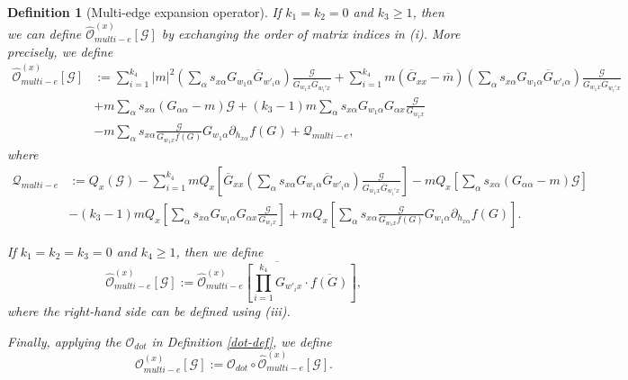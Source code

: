 \documentclass{article}
\newcommand{\1}{\mathds{1}}
\numberwithin{equation}{section}
\newcommand{\al}{\alpha}
\renewcommand{\cal}{\mathcal}
\newcommand{\wh}{\widehat}
\renewcommand{\geq}{\geqslant}
\renewcommand{\ge}{\geq}
\theoremstyle{plain} %
\newtheorem{definition}[theorem]{Definition}
\theoremstyle{remark}
\begin{document}
\begin{definition} [Multi-edge expansion operator]
 	 If $k_1=k_2=0$ and $k_3 \ge 1$, then we can define $ \wh{\cal O}_{multi-e}^{(x)} \left[\cal G\right]$ by exchanging the order of matrix indices in (i). More precisely, we define
 	\begin{align} 
 		\wh{\cal O}_{multi-e}^{(x)} \left[\cal G\right] & := \sum_{i=1}^{k_4}|m|^2  \left( \sum_\al s_{x\al }G_{w_1\al} \overline G_{w'_i\al}\right)\frac{\cal G}{G_{w_1x} \overline G_{w_i'x}}   + \sum_{i=1}^{k_4}m  (\overline G_{xx} -\overline m) \left( \sum_\al s_{x\al }G_{w_1 \al } \overline G_{ w'_i \al}\right)\frac{\cal G}{G_{w_1x} \overline G_{w_i' x}}    \nonumber \\
 		& +  m   \sum_\al s_{x\al }\left(G_{\al \al}-m\right) \cal G  +(k_3-1) m  \sum_\al s_{x\al }G_{w_1\al} G_{\al x} \frac{ \cal G}{G_{w_1x}} \nonumber\\
 		&  - m    \sum_\al s_{x\al } \frac{\cal G}{G_{w_1x}f(G)}G_{  w_1 \al}\partial_{ h_{x\al}}f(G)  +\cal Q_{multi-e} ,\label{Oe1x3}
 	\end{align}
 	where 
 	\begin{align*}
 		\cal Q_{multi-e} &:= Q_x \left( \cal G\right)  -  \sum_{i=1}^{k_4}m Q_x \left[ \overline G_{xx}  \left( \sum_\al s_{x\al }G_{w_1 \al } \overline G_{ w'_i \al}\right)\frac{\cal G}{G_{w_1 x} \overline G_{w_i' x}} \right]  -  m Q_x \left[  \sum_\al s_{x\al }\left(G_{\al \al}-m\right) \cal G\right] \\
 		&  -(k_3-1) m Q_x \left[  \sum_\al s_{x\al }G_{w_1 \al } G_{\al x} \frac{ \cal G}{G_{w_1 x}}\right]  +m Q_x \left[  \sum_\al s_{x\al } \frac{\cal G}{G_{w_1x}f(G)}G_{ w_1\al}\partial_{ h_{x\al }}f(G) \right] .%
 	\end{align*} 
 	
 	 If $k_1=k_2=k_3=0$ and $k_4\ge 1$, then we define 
 	$$\wh{\cal O}_{multi-e}^{(x)} \left[\cal G\right]:= \overline{  \wh{\cal O}_{multi-e}^{(x)} \left[  \prod_{i=1}^{k_4} G_{ w'_i x} \cdot \overline{f (G)}\right] },$$
 	where the right-hand side can be defined using (iii).
 	
 	Finally, applying the $\cal O_{dot}$ in Definition \ref{dot-def}, we define
 	$${\cal O}_{multi-e}^{(x)}[ \cal G]:= \cal O_{dot} \circ  \wh{\cal O}_{multi-e}^{(x)}   [\cal G]. $$ 
 \end{definition}
 
\end{document}
